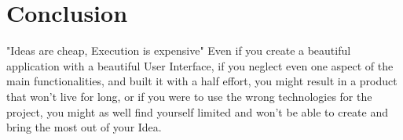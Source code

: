 \setcounter{mtc}{13}

\chapter*{Conclusion}
\label{chap:conclusion}
\minitoc
{}%
 "Ideas are cheap, Execution is expensive" Even if you create a beautiful application with
  a beautiful User Interface, if you neglect even one aspect of the main functionalities,
   and built it with a half effort, you might result in a product that won't live for long,
    or if you were to use the wrong technologies for the project, you might as well find yourself
     limited and won't be able to create and bring the most out of your Idea.
